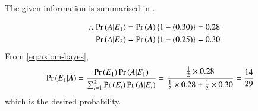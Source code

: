 The given information is summarised in 
.
\begin{table}[htb]
	\centering

\caption{}
\label{tab:ncert/12/13/6/13/1}
\end{table}
%
\begin{align}
	\therefore	\pr{A|E_1} &= \pr{A}\cbrak{1-(0.30)}
	 =  0.28
	\label{eq:ncert/12/13/6/13/4}
	\\
	\pr{A|E_2} &= \pr{A}\cbrak{1-(0.25)}
	=  0.30
	\label{eq:ncert/12/13/6/13/5}
\end{align}
From 
\eqref{eq:axiom-bayes},
\begin{align}
	\Pr\left(E_1|A\right) &= \frac{\Pr\left(E_1\right)\Pr\left(A|E_1\right)}{\sum_{i=1}^{2}\Pr\left(E_i\right)\Pr\left(A|E_i\right)}
	= \frac{\frac{1}{2}\times 0.28}{\frac{1}{2}\times 0.28 + \frac{1}{2}\times 0.30}
	= \frac{14}{29}
\end{align}
which is the desired probability.
